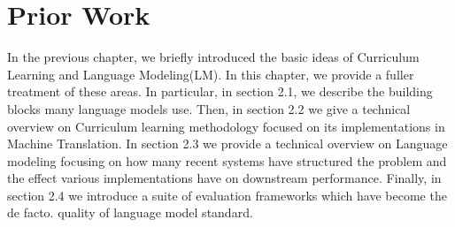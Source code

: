 \chapter{Prior Work}
In the previous chapter, we briefly introduced the basic ideas of Curriculum Learning and Language Modeling(LM). In this chapter, we provide a fuller treatment of these areas. In particular, in section 2.1, we describe the building blocks many language models use. Then, in section 2.2 we give a technical overview on Curriculum learning methodology focused on its implementations in Machine Translation. In section 2.3 we provide a technical overview on Language modeling focusing on how many recent systems have structured the problem and the effect various implementations have on downstream performance.  Finally, in section 2.4 we introduce a suite of evaluation frameworks which have become the de facto. quality of language model standard.



